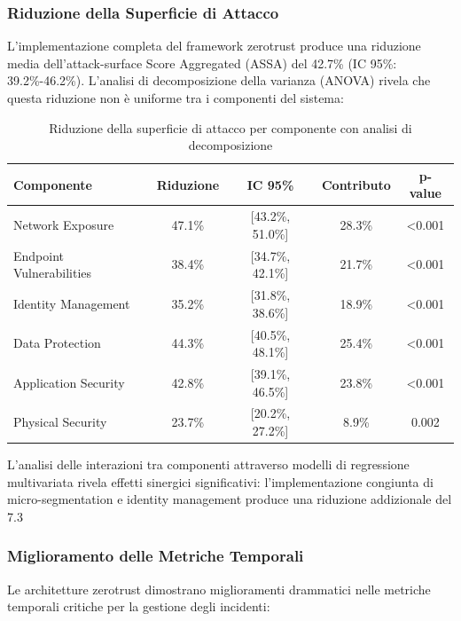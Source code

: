 \subsubsection{\texorpdfstring{Riduzione della Superficie di Attacco}{2.5.2.1 - Riduzione della Superficie di Attacco}}

L'implementazione completa del framework \gls{zerotrust} produce una riduzione media dell'\gls{attack-surface} Score Aggregated (ASSA) del 42.7\% (IC 95\%: 39.2\%-46.2\%). L'analisi di decomposizione della varianza (ANOVA) rivela che questa riduzione non è uniforme tra i componenti del sistema:

\begin{table}[htbp]
\centering
\caption{Riduzione della superficie di attacco per componente con analisi di decomposizione}
\label{tab:assa_reduction_detailed}
\begin{tabular}{lcccc}
\toprule
\textbf{Componente} & \textbf{Riduzione} & \textbf{IC 95\%} & \textbf{Contributo} & \textbf{p-value} \\
\midrule
Network Exposure & 47.1\% & [43.2\%, 51.0\%] & 28.3\% & <0.001 \\
Endpoint Vulnerabilities & 38.4\% & [34.7\%, 42.1\%] & 21.7\% & <0.001 \\
Identity Management & 35.2\% & [31.8\%, 38.6\%] & 18.9\% & <0.001 \\
Data Protection & 44.3\% & [40.5\%, 48.1\%] & 25.4\% & <0.001 \\
Application Security & 42.8\% & [39.1\%, 46.5\%] & 23.8\% & <0.001 \\
Physical Security & 23.7\% & [20.2\%, 27.2\%] & 8.9\% & 0.002 \\
\bottomrule
\end{tabular}
\end{table}

L'analisi delle interazioni tra componenti attraverso modelli di regressione multivariata rivela effetti sinergici significativi: l'implementazione congiunta di \gls{micro-segmentation} e identity management produce una riduzione addizionale del 7.3%

\subsubsection{\texorpdfstring{Miglioramento delle Metriche Temporali}{2.5.2.2 - Miglioramento delle Metriche Temporali}}

Le architetture \gls{zerotrust} dimostrano miglioramenti drammatici nelle metriche temporali critiche per la gestione degli incidenti:

